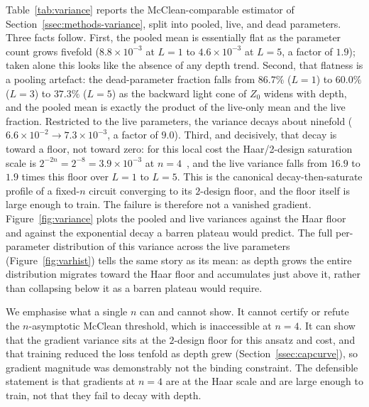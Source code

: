 \documentclass[a4paper,12pt]{iopart}
\begin{document}
Table~\ref{tab:variance} reports the McClean-comparable estimator of
Section~\ref{ssec:methods-variance}, split into pooled, live, and dead
parameters. Three facts follow. First, the pooled mean is essentially flat as
the parameter count grows fivefold ($8.8\times10^{-3}$ at $L=1$ to
$4.6\times10^{-3}$ at $L=5$, a factor of $1.9$); taken alone this looks like the
absence of any depth trend. Second, that flatness is a pooling artefact: the
dead-parameter fraction falls from $86.7\%$ ($L=1$) to $60.0\%$ ($L=3$) to
$37.3\%$ ($L=5$) as the backward light cone of $Z_0$ widens with depth, and the
pooled mean is exactly the product of the live-only mean and the live fraction.
Restricted to the live parameters, the variance decays about ninefold
($6.6\times10^{-2}\to7.3\times10^{-3}$, a factor of $9.0$). Third, and
decisively, that decay is toward a floor, not toward zero: for this local cost
the Haar/2-design saturation scale is $2^{-2n}=2^{-8}=3.9\times10^{-3}$ at
$n=4$~\cite{cerezo2021costlocality}, and the live variance falls from $16.9$ to
$1.9$ times this floor over $L=1$ to $L=5$. This is the canonical
decay-then-saturate profile of a fixed-$n$ circuit converging to its $2$-design
floor, and the floor itself is large enough to train. The failure is therefore
not a vanished gradient. Figure~\ref{fig:variance} plots the pooled and live
variances against the Haar floor and against the exponential decay a barren
plateau would predict. The full per-parameter distribution of this variance
across the live parameters (Figure~\ref{fig:varhist}) tells the same story as its
mean: as depth grows the entire distribution migrates toward the Haar floor and
accumulates just above it, rather than collapsing below it as a barren plateau
would require.

We emphasise what a single $n$ can and cannot show. It cannot certify or refute
the $n$-asymptotic McClean threshold, which is inaccessible at $n=4$. It can show
that the gradient variance sits at the $2$-design floor for this ansatz and cost,
and that training reduced the loss tenfold as depth grew (Section~\ref{ssec:capcurve}),
so gradient magnitude was demonstrably not the binding constraint. The
defensible statement is that gradients at $n=4$ are at the Haar scale and are
large enough to train, not that they fail to decay with depth.
\end{document}
